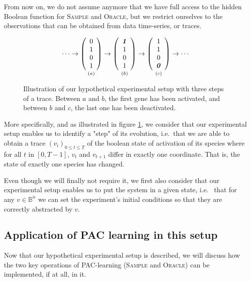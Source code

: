 \documentclass{llncs}
\begin{document}
From now on, we do not assume anymore that we have full access to the hidden Boolean function for
\textsc{Sample} and \textsc{Oracle}, but we restrict ourselves to the observations that can be obtained from data time-series, or traces.

\begin{figure}[htbp]
	{\large 
	\[
	\cdots
	\rightarrow
	\underset{\vspace{1em}(a)}{
		\left(\begin{array}{c}
		0\\ 1\\ 0\\ 1
		\end{array}\right)}
	\rightarrow
	\underset{\vspace{1em}(b)}{
		\left(\begin{array}{c}
		\textbf{\textit{1}}\\ 1\\ 0\\ 1
		\end{array}\right)}
	\rightarrow
	\underset{\vspace{1em}(c)}{
		\left(\begin{array}{c}
		1\\ 1\\ 0\\ \textbf{\textit 0}
		\end{array}\right)}
	\rightarrow
	\cdots
	\]
}
	\caption{\label{steps}Illustration of our hypothetical experimental setup with three steps of a trace. Between $a$ and $b$, the first gene has been activated, and between $b$ and $c$, the last one has been deactivated.}
\end{figure}

More specifically, and as illustrated in figure \ref{steps}, we consider that our experimental setup enables us to identify a "step" of its evolution, i.e.~that we are able to obtain a trace $(v_i)_{0 \leq t \leq T}$ of the boolean state of activation of its species where for all $t$ in $[0,T-1]$, $v_t$ and $v_{t+1}$ differ in exactly one coordinate. That is, the state of exactly one species has changed.


Even though we will finally not require it, we first also consider that our experimental setup enables us to put the system in a given state, i.e.~ that for any $v \in \mathbb{B}^n$ we can set the experiment's initial conditions so that they are correctly abstracted by $v$.

\subsection{Application of PAC learning in this setup}
Now that our hypothetical experimental setup is described, we will discuss how the two key operations of PAC-learning (\textsc{Sample} and \textsc{Oracle}) can be implemented, if at all, in it.
\end{document}
